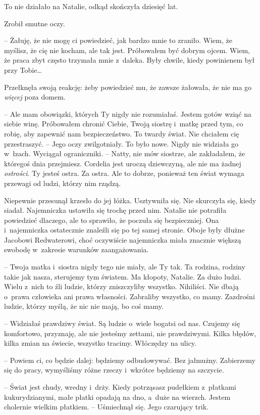 \documentclass[oneside,polish,11pt,sfheadings]{mwbk}
\begin{document}
To nie działało na Natalie, odkąd skończyła dziesięć lat.

Zrobił smutne oczy. 

-- Żałuję, że nie mogę ci powiedzieć, jak bardzo mnie
to zraniło. Wiem, że myślisz, że cię nie kocham, ale tak jest.
Próbowałem być dobrym ojcem. Wiem, że praca zbyt często trzymała mnie z~daleka. Były chwile, kiedy powinienem był przy Tobie\ldots 

Przełknęła swoją reakcję: żeby powiedzieć mu, że zawsze żałowała, że nie
ma go \textit{więcej} poza domem.

-- Ale mam obowiązki, których Ty nigdy nie rozumiałaś. Jestem gotów wziąć
na siebie winę. Próbowałem chronić Ciebie, Twoją siostrę i~matkę przed
tym, co robię, aby zapewnić nam bezpieczeństwo. To twardy świat. Nie
chciałem cię przestraszyć. -- Jego oczy zwilgotniały. To było nowe. Nigdy
nie widziała go w~łzach. Wyciągał ograniczniki. -- Natty, nie mów
siostrze, ale zakładałem, że któregoś dnia przejmiesz. Cordelia jest
uroczą dziewczyną, ale nie ma żadnej \textit{ostrości}. Ty jesteś ostra.
Za ostra. Ale to dobrze, ponieważ ten świat wymaga przewagi od ludzi,
którzy nim rządzą.

Niepewnie przesunął krzesło do jej łóżka. Usztywniła się. Nie skurczyła
się, kiedy siadał. Najemniczka ustawiła się trochę przed nim. Natalie
nie potrafiła powiedzieć dlaczego, ale to sprawiło, że poczuła się
bezpieczniej. Ona i~najemniczka ostatecznie znaleźli się po tej samej
stronie. Oboje były dłużne Jacobowi Redwaterowi, choć oczywiście
najemniczka miała znacznie większą swobodę w~zakresie warunków
zaangażowania.

-- Twoja matka i~siostra nigdy tego nie miały, ale Ty tak. Ta rodzina,
rodziny takie jak nasza, sterujemy tym światem. Ma kłopoty, Natalie. Za
dużo ludzi. Wielu z~nich to źli ludzie, którzy zniszczyliby wszystko.
Nihiliści. Nie dbają o~prawa człowieka ani prawa własności. Zabraliby
wszystko, co mamy. Zazdrośni ludzie, którzy myślą, że nic nie mają, bo
coś mamy.

-- Widziałaś prawdziwy świat. Są ludzie o~wiele bogatsi od nas. Czujemy
się komfortowo, przyznaję, ale nie jesteśmy zettami, nie prawdziwymi.
Kilka błędów, kilka zmian na świecie, wszystko tracimy. Włóczędzy na
ulicy.

-- Powiem ci, co będzie dalej: będziemy odbudowywać. Bez jałmużny.
Zabierzemy się do pracy, wymyśliśmy różne rzeczy i~wkrótce będziemy na
szczycie.

-- Świat jest chudy, wredny i~drży. Kiedy potrząsasz pudełkiem z~płatkami
kukurydzianymi, małe płatki opadają na dno, a~duże na wierzch. Jestem
cholernie wielkim płatkiem. -- Uśmiechnął się. Jego czarujący trik.
\end{document}
